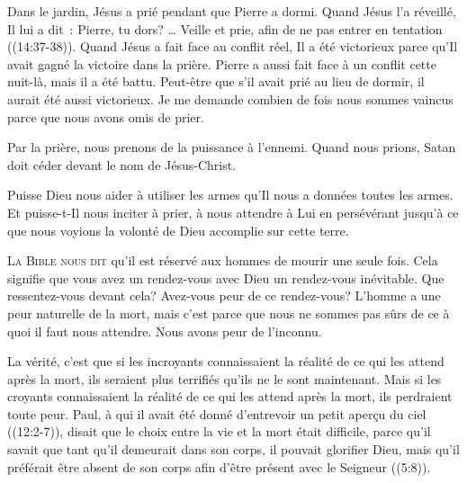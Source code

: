 
Dans le jardin, Jésus a prié pendant que Pierre a dormi.
 Quand Jésus l'a réveillé, Il lui a dit~: 
 \og Pierre, tu dors? \dots{} Veille et prie, afin de ne pas entrer
 en tentation \fg{} ((14:37-38)).
 Quand Jésus a fait face au conflit réel, Il a été victorieux
 parce qu'Il avait gagné la victoire dans la prière.
 Pierre a aussi fait face à un conflit cette nuit-là, mais il a été battu.
 Peut-être que s'il avait prié au lieu de dormir,
 il aurait été aussi victorieux. Je me demande combien de fois
 nous sommes vaincus parce que nous avons omis de prier.

Par la prière, nous prenons de la puissance à l'ennemi.
 Quand nous prions, Satan doit céder devant le nom de Jésus-Christ.

Puisse Dieu nous aider à utiliser les armes qu'Il nous a données
 \ocadr toutes les armes. Et puisse-t-Il nous inciter à prier,
 à nous attendre à Lui en persévérant jusqu'à ce que nous voyions
 la volonté de Dieu accomplie sur cette terre.

\dvrule






\lettrine{L}{a Bible nous dit}
 qu'il est réservé aux hommes de mourir une seule fois.
 Cela signifie que vous avez un rendez-vous avec Dieu
 \ocadr un rendez-vous inévitable. Que ressentez-vous devant cela?
 Avez-vous peur de ce rendez-vous? L'homme a une peur naturelle de la mort,
 mais c'est parce que nous ne sommes pas sûrs de ce à quoi
 il faut nous attendre. Nous avons peur de l'inconnu.


La vérité, c'est que si les incroyants connaissaient la réalité
 de ce qui les attend après la mort, ils seraient plus terrifiés
 qu'ils ne le sont maintenant. Mais si les croyants connaissaient
 la réalité de ce qui les attend après la mort, ils perdraient toute peur.
 Paul, à qui il avait été donné d'entrevoir un petit aperçu du ciel
 ((12:2-7)), disait que le choix entre la vie et la mort
 était difficile, parce qu'il savait que tant qu'il demeurait dans son corps,
 il pouvait glorifier Dieu, mais qu'il préférait être absent de son corps
 afin d'être présent avec le Seigneur ((5:8)).

